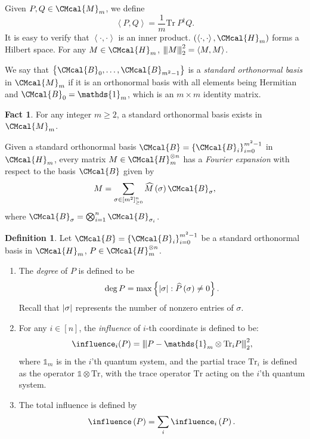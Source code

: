 \documentclass[11pt]{article}
\def\B{\CMcal{B}}
\def\H{\CMcal{H}}
\def\M{\CMcal{M}}
\theoremstyle{plain}
\theoremstyle{definition}
\newtheorem{definition}[theorem]{Definition}
\newtheorem{fact}[theorem]{Fact}
\newcommand {\set} [1] {\ensuremath{ \left\lbrace #1 \right\rbrace }}
\newcommand {\innerproduct} [2] {\ensuremath{\left \langle #1 , #2 \right \rangle}}
\newcommand {\br} [1] {\ensuremath{ \left( #1 \right) }}
\DeclarePairedDelimiter{\abs}{\lvert}{\rvert}
\newcommand{\nnorm}[1]{{\left\vert\kern-0.25ex\left\vert\kern-0.25ex\left\vert #1
		\right\vert\kern-0.25ex\right\vert\kern-0.25ex\right\vert}}
\newcommand {\Tr} {\ensuremath{ \mathrm{Tr} }}
\newcommand {\id} {\ensuremath{\mathds{1}}}
\newcommand{\1}{\mathbb{1}} %
\begin{document}
	Given $P,Q\in\M_m$, we define
	\begin{equation}\label{eqn:innerproduct}	
	\innerproduct{P}{Q}=\frac{1}{m}\Tr~P^{\dagger}Q.
	\end{equation}
It is easy to verify that $\innerproduct{\cdot}{\cdot}$ is an inner product. $\br{\innerproduct{\cdot}{\cdot},\H_m}$ forms a Hilbert space. For any $M\in\H_m$, $\nnorm{M}_2^2=\innerproduct{M}{M}$.	


	We say that $\set{\B_0,\ldots,\B_{m^2-1}}$ is a {\em standard orthonormal basis} in $\M_m$ if it is an orthonormal basis with all elements being Hermitian and $\B_0=\id_m$, which is an $m\times m$ identity matrix.
 \begin{fact}\cite[Lemma 2.10]{qin2021nonlocal}\label{fact:fourier-expansion}
     For any integer $m\geq 2$, a standard orthonormal basis exists in $\M_m$. 
 \end{fact}
	
\par{Given a standard orthonormal basis $\B=\set{\B_i}_{i=0}^{m^2-1}$ in $\H_m$, every matrix $M\in\H_m^{\otimes n}$ has a {\em Fourier expansion} with respect to the basis $\B$ given by
\[M=\sum_{\sigma\in[m^2]_{\geq 0}^{n}}\widehat{M}\br{\sigma}\B_{\sigma},\] where $\B_{\sigma}=\bigotimes_{i=1}^n\B_{\sigma_i}$.
}
\par{
\begin{definition}\label{def:inf}
		Let $\B=\set{\B_i}_{i=0}^{m^2-1}$ be a standard orthonormal basis in $\H_m$, $P\in\H_m^{\otimes n}$.
		\begin{enumerate}
			\item The {\em degree} of $P$ is defined to be \[\deg P=\max\set{\abs{\sigma}:\widehat{P}\br{\sigma}\neq 0}.\]
Recall that $\abs{\sigma}$ represents the number of nonzero entries of $\sigma$.
            \item For any $i\in[n]$, the {\em influence} of $i$-th coordinate is defined to be: \[\influence_i(P)=\nnorm{P-\id_m \otimes \Tr_iP}_2^2,\]
            where $\id_m$ is in the $i$'th quantum system, and the partial trace $\Tr_i$  is defined as the operator $\id\otimes\Tr$, with the trace operator $\Tr$ acting on the $i$'th quantum system.
			\item The total influence is defined by\[\influence\br{P}=\sum_i\influence_i\br{P}.\]
		\end{enumerate}
	\end{definition}
 }
\end{document}
